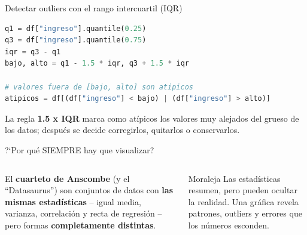 \documentclass[aspectratio=169]{beamer}
\begin{document}
\begin{frame}[fragile]{Detectar outliers con el rango intercuartil (IQR)}
\begin{lstlisting}[language=Python]
q1 = df["ingreso"].quantile(0.25)
q3 = df["ingreso"].quantile(0.75)
iqr = q3 - q1
bajo, alto = q1 - 1.5 * iqr, q3 + 1.5 * iqr

# valores fuera de [bajo, alto] son atipicos
atipicos = df[(df["ingreso"] < bajo) | (df["ingreso"] > alto)]
\end{lstlisting}
  La regla \textbf{1.5 x IQR} marca como at\'ipicos los valores muy alejados del
  grueso de los datos; despu\'es se decide corregirlos, quitarlos o conservarlos.
\end{frame}

\begin{frame}{?`Por qu\'e SIEMPRE hay que visualizar?}
  \begin{columns}[c]
      El \textbf{cuarteto de Anscombe} (y el ``Datasaurus'') son conjuntos de
      datos con \textbf{las mismas estad\'isticas} -- igual media, varianza,
      correlaci\'on y recta de regresi\'on -- pero formas \textbf{completamente
      distintas}.
      \vspace{0.4em}
      \begin{block}{Moraleja}
        Las estad\'isticas resumen, pero pueden ocultar la realidad. Una gr\'afica
        revela patrones, outliers y errores que los n\'umeros esconden.
      \end{block}
  \end{columns}
\end{frame}

\end{document}
